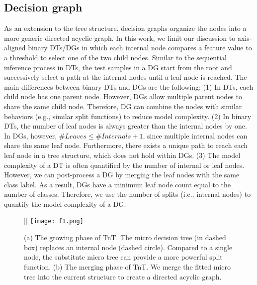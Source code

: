 \documentclass{article}
\begin{document}
\vspace{-2mm}
\subsection{Decision graph}\vspace{-2mm}
As an extension to the tree structure, decision graphs organize the nodes into a more generic directed acyclic graph. In this work, we limit our discussion to axis-aligned binary DTs/DGs in which each internal node compares a feature value to a threshold to select one of the two child nodes. Similar to the sequential inference process in DTs, the test samples in a DG start from the root and successively select a path at the internal nodes until a leaf node is reached. The main differences between binary DTs and DGs are the following: (1) In DTs, each child node has one parent node. However, DGs allow multiple parent nodes to share the same child node. Therefore, DG can combine the nodes with similar behaviors (e.g., similar split functions) to reduce model complexity. (2) In binary DTs, the number of leaf nodes is always greater than the internal nodes by one. In DGs, however, $\# Leaves \leq \# Internals + 1 $, since multiple internal nodes can share the same leaf node. Furthermore, there exists a unique path to reach each leaf node in a tree structure, which does not hold within DGs. (3) The model complexity of a DT is often quantified by the number of internal or leaf nodes. However, we can post-process a DG by merging the leaf nodes with the same class label. As a result, DGs have a minimum leaf node count equal to the number of classes. Therefore, we use the number of splits (i.e., internal nodes) to quantify the  model complexity of a DG.

\begin{wrapfigure}{r}{0cm}
  \centering 
  \raisebox{0pt}[\dimexpr{}\baselineskip\relax]{
  \texttt{[image: f1.png]}}
  \caption{(a) The growing phase of TnT. The micro decision tree (in dashed box) replaces an internal node (dashed circle). Compared to a single node, the substitute micro tree can provide a more powerful split function. (b) The merging phase of TnT. We merge the fitted micro tree into the current structure to create a directed acyclic graph.}
  \vspace{-3mm}
  \label{f1}
\end{wrapfigure}

\vspace{-2mm}
\end{document}
